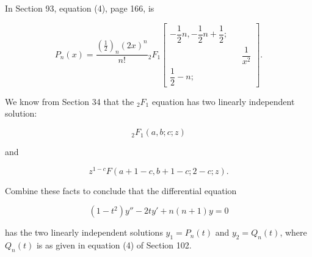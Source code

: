 \begin{problem}\label{problem3chapter10}
In Section 93, equation (4), page 166, is

$$P_n(x) = \dfrac{(\frac{1}{2})_n (2x)^n}{n!} {}_2F_1 \left[ \begin{array}{rlr}
-\dfrac{1}{2}n, -\dfrac{1}{2}n+\dfrac{1}{2}; & & \\
& & \dfrac{1}{x^2} \\ 
\dfrac{1}{2}-n; & &
\end{array} \right].$$

We know from Section 34 that the ${}_2F_1$ equation has two linearly independent solution:

$${}_2F_1(a,b;c;z)$$

and

$$z^{1-c}F(a+1-c,b+1-c;2-c;z).$$

Combine these facts to conclude that the differential equation

$$(1-t^2)y'' - 2ty' + n(n+1)y=0$$

has the two linearly independent solutions $y_1=P_n(t)$ and $y_2 = Q_n(t)$, where $Q_n(t)$ is as given in equation (4) of Section 102.
\end{problem}
